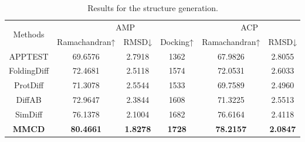 \documentclass[letterpaper]{article} %
\begin{document}
\begin{table}[ht]
\centering
\setlength{\tabcolsep}{16pt}
\begin{tabular}{cccccc}
\hline
\multirow{2}{*}{Methods} & \multicolumn{3}{c}{AMP}                            & \multicolumn{2}{c}{ACP}
\\ \cmidrule(r){2-4} \cmidrule(r){5-6}
                         & Ramachandran↑    & RMSD↓           & Docking↑        & Ramachandran↑  & RMSD↓  \\ \hline
APPTEST                  & 69.6576          & 2.7918          & 1362            & 67.9826        & 2.8055 \\
FoldingDiff              & 72.4681          & 2.5118          & 1574            & 72.0531        & 2.6033 \\
ProtDiff                 & 71.3078          & 2.5544          & 1533            & 69.7589        & 2.4960 \\
DiffAB                   & 72.9647          & 2.3844          & 1608            & 71.3225        & 2.5513 \\
SimDiff                  & 76.1378          & 2.1004          & 1682            & 76.6164        & 2.4118 \\
\textbf{MMCD}            & \textbf{80.4661} & \textbf{1.8278} & \textbf{1728}   & \textbf{78.2157}        & \textbf{2.0847} \\ \hline
\end{tabular}
\caption{Results for the structure generation.}
\end{table}
\end{document}
